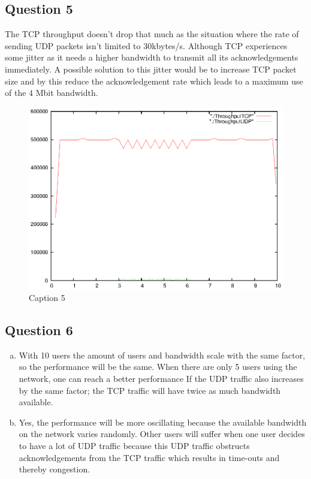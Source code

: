 \documentclass[12pt]{article}
\begin{document}
\subsection*{Question 5}
The TCP throughput doesn't drop that much as the situation where the rate of sending UDP packets isn't limited to 30kbytes/s. Although TCP experiences some jitter as it needs a higher bandwidth to transmit all its acknowledgements immediately. A possible solution to this jitter would be to increase TCP packet size and by this reduce the acknowledgement rate which leads to a maximum use of the 4 Mbit bandwidth.
\begin{figure}[h]
\centerline{\includegraphics{pictures/E1Q5.eps}}
\caption{Caption 5}
\label{fig:question5}
\end{figure}

\subsection*{Question 6}
\begin{enumerate}[a)]
\item
With 10 users the amount of users and bandwidth scale with the same factor, so the performance will be the same.
When there are only 5 users using the network, one can reach a better performance If the UDP traffic also increases by the same factor; the TCP traffic will have twice as much bandwidth available.
\item
Yes, the performance will be more oscillating because the available bandwidth on the network varies randomly. Other users will suffer when one user decides to have a lot of UDP traffic because this UDP traffic obstructs acknowledgements from the TCP traffic which results in time-outs and thereby congestion.
\end{enumerate}
\end{document}
